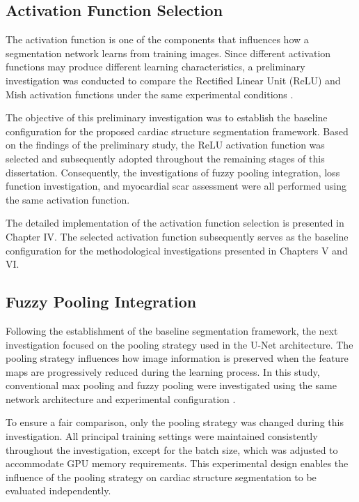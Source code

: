 \subsection{Activation Function Selection}
\label{subsec:activation-selection}

The activation function is one of the components that influences how a segmentation network learns from training images. Since different activation functions may produce different learning characteristics, a preliminary investigation was conducted to compare the Rectified Linear Unit (ReLU) and Mish activation functions under the same experimental conditions \citep{Riandini2022IST,Nwankpa2018,Misra2020}.

The objective of this preliminary investigation was to establish the baseline configuration for the proposed cardiac structure segmentation framework. Based on the findings of the preliminary study, the ReLU activation function was selected and subsequently adopted throughout the remaining stages of this dissertation. Consequently, the investigations of fuzzy pooling integration, loss function investigation, and myocardial scar assessment were all performed using the same activation function.

The detailed implementation of the activation function selection is presented in Chapter IV. The selected activation function subsequently serves as the baseline configuration for the methodological investigations presented in Chapters V and VI.

\subsection{Fuzzy Pooling Integration}
\label{subsec:fuzzy-pooling}

Following the establishment of the baseline segmentation framework, the next investigation focused on the pooling strategy used in the U-Net architecture. The pooling strategy influences how image information is preserved when the feature maps are progressively reduced during the learning process. In this study, conventional max pooling and fuzzy pooling were investigated using the same network architecture and experimental configuration \citep{Diamantis2020,Nirthika2022}.

To ensure a fair comparison, only the pooling strategy was changed during this investigation. All principal training settings were maintained consistently throughout the investigation, except for the batch size, which was adjusted to accommodate GPU memory requirements. This experimental design enables the influence of the pooling strategy on cardiac structure segmentation to be evaluated independently.

